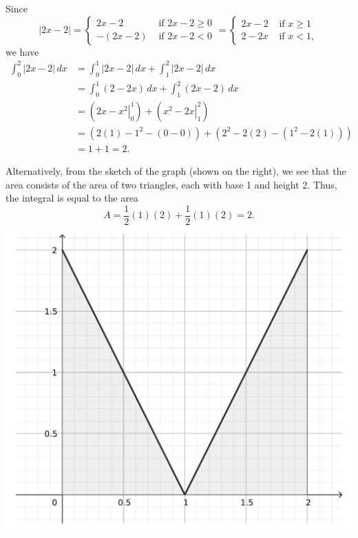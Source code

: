 \documentclass[12pt]{article}
\newcommand{\abs}[1]{\lvert #1\rvert}
\begin{document}
\begin{enumerate}
\medskip

Since 
\[
\abs{2x-2} = \begin{cases}2x-2 & \text{ if } 2x-2\geq 0\\ -(2x-2) & \text{ if } 2x-2<0\end{cases} = \begin{cases} 2x-2 & \text{ if } x\geq 1\\ 2-2x & \text{ if } x<1,\end{cases}
\]
we have
\begin{align*}
\int_0^2 \abs{2x-2}\,dx & = \int_0^1\abs{2x-2}\,dx+\int_1^2\abs{2x-2}\,dx\\
& = \int_0^1 (2-2x)\,dx + \int_1^2 (2x-2)\,dx\\
& = \left(\left.2x-x^2\right|_0^1\right) + \left(\left.x^2-2x\right|_1^2\right)\\
& = (2(1)-1^2-(0-0))+ ( 2^2-2(2) - (1^2-2(1)))\\
& = 1+1 = 2.
\end{align*}

\begin{multicols}{2}
Alternatively, from the sketch of the graph (shown on the right), we see that the area consists of the area of two triangles, each with base 1 and height 2. Thus, the integral is equal to the area
\[
A = \frac{1}{2}(1)(2)+\frac{1}{2}(1)(2) = 2.
\]
\includegraphics[width=\columnwidth]{TT6-fig1}
\end{multicols}


\end{enumerate}
\end{document}
